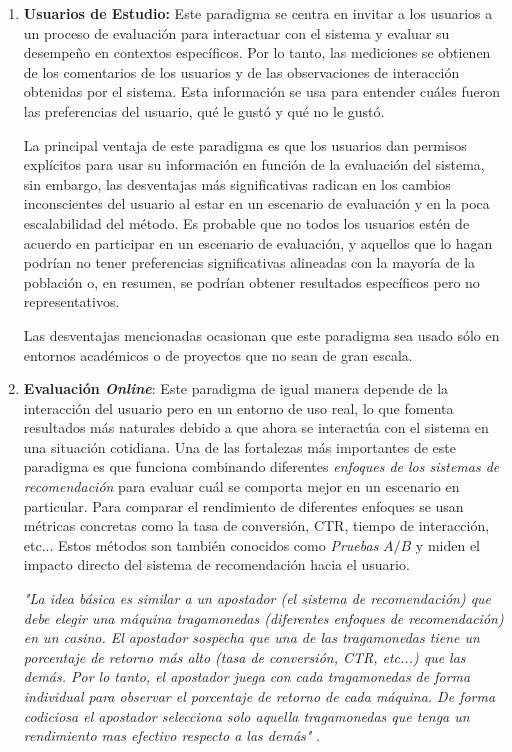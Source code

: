 \begin{enumerate}

    \item \textbf{Usuarios de Estudio: } Este paradigma se centra en invitar a los usuarios a un proceso de evaluación para interactuar con el sistema y evaluar su desempeño en contextos específicos. Por lo tanto, las mediciones se obtienen de los comentarios de los usuarios y de las observaciones de interacción obtenidas  por el sistema. 
    Esta información se usa para entender cuáles fueron las preferencias del usuario, qué le gustó y qué no le gustó.

    La principal ventaja de este paradigma es que los usuarios dan permisos explícitos para usar su información en función de la evaluación del sistema, sin embargo, las desventajas más significativas radican en los cambios inconscientes del usuario al estar en un escenario de evaluación y en la poca escalabilidad del método. 
    Es probable que no todos los usuarios estén de acuerdo en participar en un escenario de evaluación, y aquellos que lo hagan podrían no tener preferencias significativas alineadas con la mayoría de la población o, en resumen, se podrían obtener resultados específicos pero no representativos.

    Las desventajas mencionadas ocasionan que este paradigma sea usado sólo en entornos académicos o de proyectos que no sean de gran escala.

    \newpage
    \thispagestyle{plain}
    \vspace*{0.2cm}
    
    \item{\textbf{Evaluación \textit{Online}}}: Este paradigma de igual manera depende de la interacción del usuario pero en un entorno de uso real, lo que fomenta resultados más naturales debido a que ahora se interactúa con el sistema en una situación cotidiana. Una de las fortalezas más importantes de este paradigma es que funciona combinando diferentes \textit{enfoques de los sistemas de recomendación} para evaluar cuál se comporta mejor en un escenario en particular. 
    Para comparar el rendimiento de diferentes enfoques se usan métricas concretas como la tasa de conversión, CTR, tiempo de interacción, etc... Estos métodos son también conocidos como \textit{Pruebas} $A / B$ y miden el impacto directo del sistema de recomendación hacia el usuario. 
 
    \textit{"La idea básica es similar a un apostador (el sistema de recomendación) que debe elegir una máquina tragamonedas (diferentes enfoques de recomendación) en un casino. El apostador sospecha que una de las tragamonedas tiene un porcentaje de retorno más alto (tasa de conversión, CTR, etc...) que las demás. Por lo tanto,  el apostador juega con cada tragamonedas de forma individual para observar el porcentaje de retorno de cada máquina. De forma codiciosa el apostador selecciona solo aquella tragamonedas que tenga un rendimiento mas efectivo respecto a las demás"} \parencite{Aggarwal2016}.


\end{enumerate}
